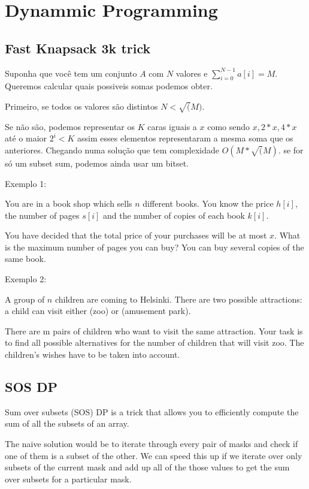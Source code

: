 \chapter{Dynammic Programming}
    \section{Fast Knapsack 3k trick}
        Suponha que você tem um conjunto $A$ com $N$ valores e $\sum_{i=0}^{N-1} a[i] = M$.
        Queremos calcular quais possiveis somas podemos obter.
        
        Primeiro, se todos os valores são distintos $N < \sqrt(M)$.
        
        Se não são, podemos representar os $K$ caras iguais a $x$ como sendo $x, 2*x, 4*x$ até o maior $2^i < K$ assim esses elementos representaram a mesma soma que os anteriores.
        Chegando numa solução que tem complexidade $O(M*\sqrt(M)$. se for só um subset sum, podemos ainda usar um bitset.
        
        Exemplo 1:
        
        You are in a book shop which sells $n$ different books. You know the price $h[i]$, the number of pages $s[i]$ and the number of copies of each book $k[i]$.

        You have decided that the total price of your purchases will be at most $x$. What is the maximum number of pages you can buy? You can buy several copies of the same book.
        
        
        Exemplo 2:

        A group of $n$ children are coming to Helsinki. There are two possible attractions: a child can visit either  (zoo) or  (amusement park).

        There are m pairs of children who want to visit the same attraction. Your task is to find all possible alternatives for the number of children that will visit zoo. The children's wishes have to be taken into account.
        
    \section{SOS DP}
        Sum over subsets (SOS) DP is a trick that allows you to efficiently compute the sum of all the subsets of an array.

        The naive solution would be to iterate through every pair of masks and check if one of them is a subset of the other.
        We can speed this up if we iterate over only subsets of the current mask and add up all of the those values to get the sum over subsets for a particular mask.

